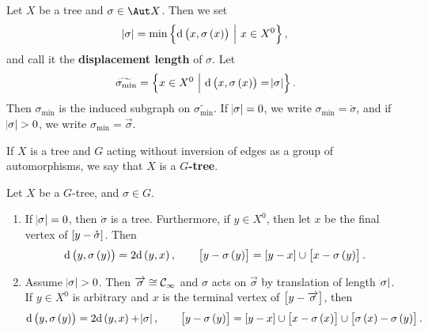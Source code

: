 \pagebreak

\begin{definition}
Let $ X $ be a tree and $ \sigma \in \Aut X $. Then we set
$$ \abs{\sigma} = \min\cbr{\d\br{x, \sigma\br{x}} \st x \in X^0}, $$
and call it the \textbf{displacement length} of $ \sigma $. Let
$$ \widetilde{\sigma_{\min}} = \cbr{x \in X^0 \st \d\br{x, \sigma\br{x}} = \abs{\sigma}}. $$
Then $ \sigma_{\min} $ is the induced subgraph on $ \widetilde{\sigma_{\min}} $. If $ \abs{\sigma} = 0 $, we write $ \sigma_{\min} = \mathring{\sigma} $, and if $ \abs{\sigma} > 0 $, we write $ \sigma_{\min} = \overrightarrow{\sigma} $.
\end{definition}


\begin{definition}
If $ X $ is a tree and $ G $ acting without inversion of edges as a group of automorphisms, we say that $ X $ is a \textbf{$ G $-tree}.
\end{definition}

\begin{proposition}
Let $ X $ be a $ G $-tree, and $ \sigma \in G $.
\begin{enumerate}
\item If $ \abs{\sigma} = 0 $, then $ \mathring{\sigma} $ is a tree. Furthermore, if $ y \in X^0 $, then let $ x $ be the final vertex of $ \sbr{y - \mathring{\sigma}} $. Then
$$ \d\br{y, \sigma\br{y}} = 2\d\br{y, x}, \qquad \sbr{y - \sigma\br{y}} = \sbr{y - x} \cup \sbr{x - \sigma\br{y}}. $$
\item Assume $ \abs{\sigma} > 0 $. Then $ \overrightarrow{\sigma} \cong \mathcal{C}_\infty $ and $ \sigma $ acts on $ \overrightarrow{\sigma} $ by translation of length $ \abs{\sigma} $. If $ y \in X^0 $ is arbitrary and $ x $ is the terminal vertex of $ \sbr{y - \overrightarrow{\sigma}} $, then
$$ \d\br{y, \sigma\br{y}} = 2\d\br{y, x} + \abs{\sigma}, \qquad \sbr{y - \sigma\br{y}} = \sbr{y - x} \cup \sbr{x - \sigma\br{x}} \cup \sbr{\sigma\br{x} - \sigma\br{y}}. $$
\end{enumerate}
\end{proposition}

